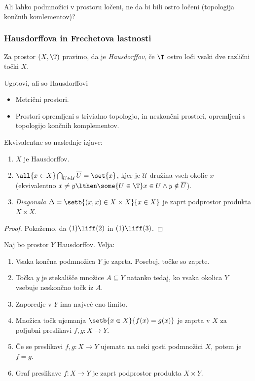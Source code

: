 \begin{primer}
    Ali lahko podmnožici v prostoru ločeni, ne da bi bili ostro ločeni (topologija končnih komlementov)?
\end{primer}

\subsubsection{Hausdorffova in Frechetova lastnosti}
\begin{definicija}
    Za prostor $(X, \T)$ pravimo, da je \emph{Hausdorffov}, če $\T$ ostro loči vsaki dve različni točki $X$.
\end{definicija}

\begin{primer}
    Ugotovi, ali so Hausdorffovi
    \begin{itemize}
        \item Metrični prostori.
        \item Prostori opremljeni s trivialno topologjo, in neskončni prostori, opremljeni s topologijo končnih komplementov.
    \end{itemize}
\end{primer}

\begin{trditev}
    Ekvivalentne so naslednje izjave:
    \begin{enumerate}
        \item $X$ je Hausdorffov.
        \item $\all{x \in X} \bigcap_{U \in \mathcal{U}} \overline{U} = \set{x}$, kjer je $\mathcal{U}$ družina vseh okolic $x$ (ekvivalentno $x \neq y \lthen \some{U \in \T} x \in U \land y \notin \overline{U}$).
        \item \emph{Diagonala} $\Delta = \setb{(x,x) \in X \times X}{x \in X}$ je zaprt podprostor produkta $X \times X$.
    \end{enumerate}
\end{trditev}

\begin{proof}
    Pokažemo, da $(1) \liff (2)$ in $(1) \liff (3)$.
\end{proof}

\begin{izrek}
    Naj bo prostor $Y$ Hausdorffov. Velja:
    \begin{enumerate}
        \item Vsaka končna podmnožica $Y$ je zaprta. Posebej, točke so zaprte.
        \item Točka $y$ je stekališče množice $A \subseteq Y$ natanko tedaj, ko vsaka okolica $Y$ vsebuje neskončno točk iz $A$.
        \item Zaporedje v $Y$ ima največ eno limito.
        \item Množica točk ujemanja $\setb{x \in X}{f(x) = g(x)}$ je zaprta v $X$ za poljubni preslikavi $f, g: X \to Y$.
        \item Če se preslikavi $f, g: X \to Y$ ujemata na neki gosti podmnožici $X$, potem je $f = g$.
        \item Graf preslikave $f: X \to Y$ je zaprt podprostor produkta $X \times Y$.
    \end{enumerate}
\end{izrek}

